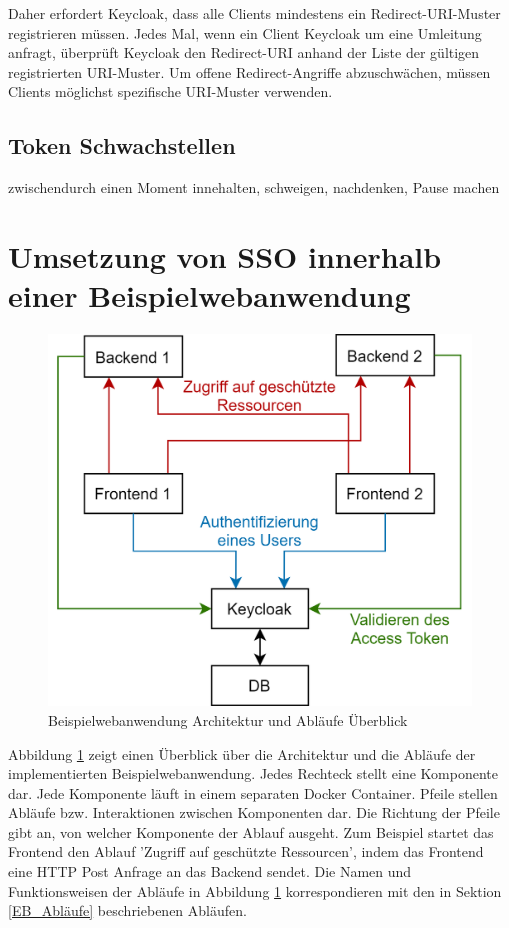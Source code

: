 Daher erfordert Keycloak, dass alle Clients mindestens ein Redirect-URI-Muster registrieren müssen. Jedes Mal, wenn ein Client Keycloak um eine Umleitung anfragt, überprüft Keycloak den Redirect-URI anhand der Liste der gültigen registrierten URI-Muster. Um offene Redirect-Angriffe abzuschwächen, müssen Clients möglichst spezifische URI-Muster verwenden. \cite{keycloakDocs}

\subsection{Token Schwachstellen}

zwischendurch einen Moment innehalten, schweigen, nachdenken, Pause machen



\section{Umsetzung von SSO innerhalb einer Beispielwebanwendung} \label{EB_Beispielwebanwendung}

\begin{figure}[!ht]
	\centering
	\includegraphics[width=.8\textwidth]{Images/Ebert/ArchitectureDiagram.png}
	\caption{Beispielwebanwendung Architektur und Abläufe Überblick}
	\label{fig:EB_Beispielwebanwendung Architektur und Abläufe Überblick}
\end{figure}

Abbildung \ref{fig:EB_Beispielwebanwendung Architektur und Abläufe Überblick} zeigt einen Überblick über die Architektur und die Abläufe der implementierten Beispielwebanwendung. Jedes Rechteck stellt eine Komponente dar. Jede Komponente läuft in einem separaten Docker Container. Pfeile stellen Abläufe bzw. Interaktionen zwischen Komponenten dar. Die Richtung der Pfeile gibt an, von welcher Komponente der Ablauf ausgeht. Zum Beispiel startet das Frontend den Ablauf 'Zugriff auf geschützte Ressourcen', indem das Frontend eine HTTP Post Anfrage an das Backend sendet. Die Namen und Funktionsweisen der Abläufe in Abbildung \ref{fig:EB_Beispielwebanwendung Architektur und Abläufe Überblick} korrespondieren mit den in Sektion \ref{EB_Abläufe} beschriebenen Abläufen. 

